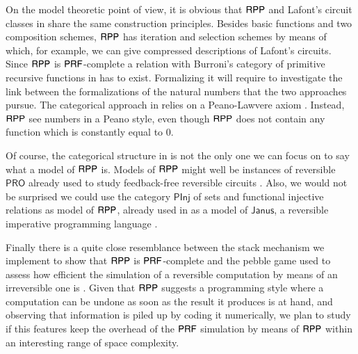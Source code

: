 On the model theoretic point of view, it is obvious that $ \mathsf{RPP} $ and  Lafont's circuit classes in \cite{Lafont2003257} 
share the same construction principles. Besides basic functions and two composition schemes, $ \mathsf{RPP} $ has iteration 
and selection schemes by means of which, for example, we can give compressed descriptions of Lafont's circuits.
Since $ \mathsf{RPP} $ is $ \mathsf{P}\mathsf{RF} $-complete a relation with Burroni's category of primitive recursive functions 
in \cite{burroni1986} has to exist. Formalizing it will require to investigate  the link between the formalizations of 
the natural numbers that the two approaches pursue. The categorical approach in \cite{burroni1986} relies on a
Peano-Lawvere axiom \cite{Lawvere1506}. Instead, $ \mathsf{RPP} $ see numbers in a Peano style,
even though $ \mathsf{RPP} $ does not contain any function which is constantly equal to 0.

Of course, the categorical structure in \cite{burroni1986} is not the only one we can focus on
to say what a model of $ \mathsf{RPP} $ is. Models of $ \mathsf{RPP} $ might well be instances of reversible $ \mathsf{PRO} $ already used
to study feedback-free reversible circuits \cite{burroni1986,burroni1993tcs,lafont1995rta,Lafont2003257,lafont2013sc}.
Also, we would not be surprised we could use the category $ \mathsf{PInj} $ of sets and functional injective relations as model
of $ \mathsf{RPP} $, already used in \cite{paolini2017lipics} as a model of $ \mathsf{Janus} $, a reversible imperative programming language 
\cite{Lutz86,Yokoyama:2007:RPL:1244381.1244404}.

Finally there is a quite close resemblance between the stack mechanism we implement to show that $ \mathsf{RPP} $ is $ \mathsf{P}\mathsf{RF} $-complete
and the pebble game used to assess how efficient the simulation of a reversible computation by means of an irreversible one is
\cite{li1996royal,bennett1989siamjc}. Given that $ \mathsf{RPP} $ suggests a programming style where a computation can be undone as 
soon as the result it produces is at hand, and observing that information is piled up by coding it numerically, 
we plan to study if this features keep the overhead of the $ \mathsf{P}\mathsf{RF} $ simulation by means of $ \mathsf{RPP} $ within an
interesting range of space complexity.

	
